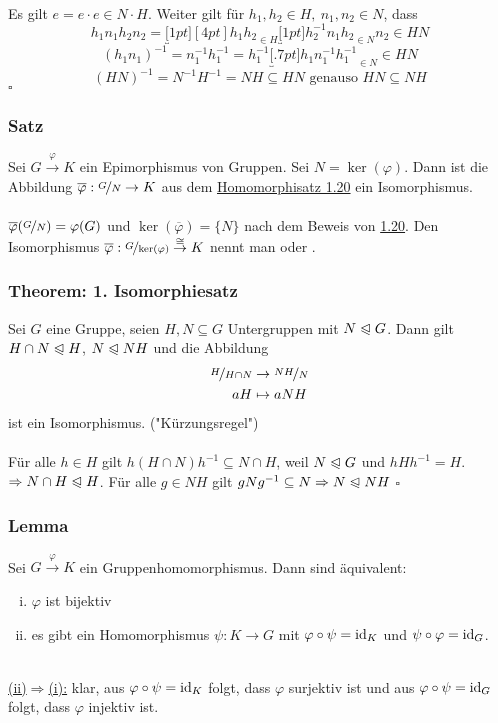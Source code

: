 \\
Es gilt $e=e\cdot e\in N\cdot H$. 
Weiter gilt für $h_1,h_2 \in H,~n_1,n_2 \in N$, dass
\[
h_1n_1h_2n_2=\underbracket[1pt][4pt]{h_1h_2}_{\in H} \underbracket[1pt]{h_2^{-1}n_1h_2}_{\in N}n_2 \in HN 
\]
\[
(h_1n_1)^{-1}=n_1^{-1}h_1^{-1}=h_1^{-1}\underbracket[.7pt]{h_1n_1^{-1}h_1^{-1}}_{\in N} \in HN 
\]
\[
(HN)^{-1}=N^{-1}H^{-1}=NH \subseteq HN \text{ genauso } HN \subseteq NH 
\]
\hfill $\square$

\subsubsection*{Satz}
Sei $G\stackrel{\varphi}{\to}K$ ein Epimorphismus von Gruppen. Sei $N=\ker(\varphi)$. 
Dann ist die Abbildung $\overline{\varphi}:\nicefrac{G}{N}\to K$ aus dem \hyperref[sub:der_homomorphiesatz]{Homomorphisatz 1.20} ein Isomorphismus.\\

\\
$\overline{\varphi}(\nicefrac{G}{N})=\varphi(G)$ und $\ker(\overline{\varphi})=\{N\}$ nach dem Beweis von \hyperref[sub:der_homomorphiesatz]{1.20}.
Den Isomorphismus $\overline{\varphi}:\nicefrac{G}{\ker(\varphi)} \stackrel{\cong}{\to}K$ nennt man  oder .

\subsubsection*{Theorem: 1. Isomorphiesatz}
Sei $G$ eine Gruppe, seien $H,N\subseteq G$ Untergruppen mit $N\trianglelefteqslant G$. 
Dann gilt $H\cap N\trianglelefteqslant H$, $N \trianglelefteqslant NH$ und die Abbildung
\begin{equation*}
\begin{aligned}
	\nicefrac{H}{H\cap N} &\to \nicefrac{NH}{N}\\
	aH &\mapsto aNH
\end{aligned}
\end{equation*}
ist ein Isomorphismus. \qquad ("Kürzungsregel")\\

\\
Für alle $h\in H$ gilt $h(H\cap N)h^{-1}\subseteq N\cap H$, weil $N\trianglelefteqslant G$ und $hHh^{-1}=H$. 
$\Rightarrow N\cap H \trianglelefteqslant H$. 
Für alle $g\in NH$ gilt $gNg^{-1}\subseteq N \Rightarrow N\trianglelefteqslant NH$
\hfill $\square$

\subsubsection*{Lemma}
Sei $G\stackrel{\varphi}{\to}K$ ein Gruppenhomomorphismus. 
Dann sind äquivalent:
\begin{enumerate}[(i)]
	\item $\varphi$ ist bijektiv
	\item es gibt ein Homomorphismus $\psi:K\to G$ mit $\varphi \circ \psi=\operatorname{id}_K$ und $\psi\circ\varphi=\operatorname{id}_G$.
\end{enumerate}
\\
\uline{(ii)$\Rightarrow$(i):} klar, aus $\varphi\circ\psi=\operatorname{id}_K$ folgt, dass $\varphi$ surjektiv ist und aus $\varphi\circ\psi=\operatorname{id}_G$ folgt, dass $\varphi$ injektiv ist.\\

